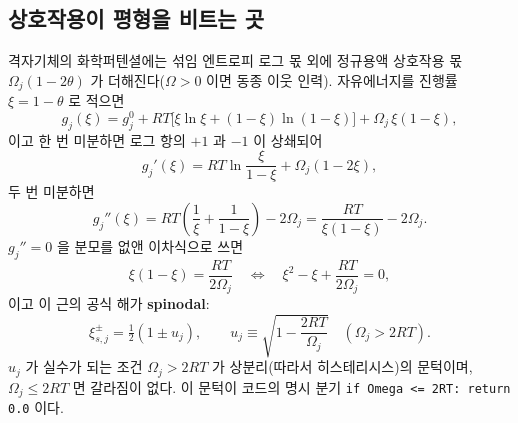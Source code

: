 \documentclass[11pt,a4paper]{article}
\newcommand{\code}[1]{\texttt{#1}}
\begin{document}
\subsection{상호작용이 평형을 비트는 곳}
격자기체의 화학퍼텐셜에는 섞임 엔트로피 로그 몫 외에 정규용액 상호작용 몫 $\Omega_j(1-2\theta)$ 가 더해진다($\Omega>0$
이면 동종 이웃 인력). 자유에너지를 진행률 $\xi=1-\theta$ 로 적으면
\begin{equation}
g_j(\xi)=g_j^0+RT\big[\xi\ln\xi+(1-\xi)\ln(1-\xi)\big]+\Omega_j\,\xi(1-\xi),
\label{eq:gxi}
\end{equation}
이고 한 번 미분하면 로그 항의 $+1$ 과 $-1$ 이 상쇄되어
\begin{equation}
g_j'(\xi)
=RT\ln\frac{\xi}{1-\xi}+\Omega_j(1-2\xi),
\label{eq:gprime_v8}
\end{equation}
두 번 미분하면
\begin{equation}
g_j''(\xi)
=RT\left(\frac1{\xi}+\frac1{1-\xi}\right)-2\Omega_j
=\frac{RT}{\xi(1-\xi)}-2\Omega_j.
\label{eq:gpp_v8}
\end{equation}
$g_j''=0$ 을 분모를 없앤 이차식으로 쓰면
\begin{equation}
\xi(1-\xi)=\frac{RT}{2\Omega_j}
\quad\Longleftrightarrow\quad
\xi^2-\xi+\frac{RT}{2\Omega_j}=0,
\label{eq:spinodalquad}
\end{equation}
이고 이 근의 공식 해가 \textbf{spinodal}:
\begin{equation}
\xi_{s,j}^\pm=\tfrac12(1\pm u_j),\qquad
u_j\equiv\sqrt{1-\frac{2RT}{\Omega_j}}\quad(\Omega_j>2RT).
\label{eq:spinodal}
\end{equation}
$u_j$ 가 실수가 되는 조건 $\Omega_j>2RT$ 가 상분리(따라서 히스테리시스)의 문턱이며, $\Omega_j\le2RT$ 면 갈라짐이 없다.
이 문턱이 코드의 명시 분기 \code{if Omega <= 2RT: return 0.0} 이다.
\end{document}
